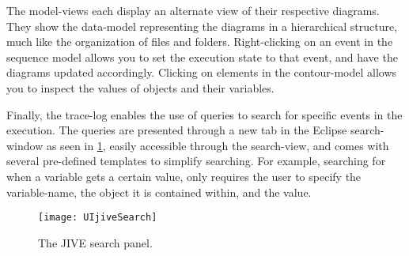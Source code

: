 The model-views each display an alternate view of their respective diagrams.
They show the data-model representing the diagrams in a hierarchical structure, much like the organization of files and folders.
Right-clicking on an event in the sequence model allows you to set the execution state to that event, and have the diagrams updated accordingly.
Clicking on elements in the contour-model allows you to inspect the values of objects and their variables.

Finally, the trace-log enables the use of queries to search for specific events in the execution.
The queries are presented through a new tab in the Eclipse search-window as seen in \cref{fig:UIjiveSearchPanel}, easily accessible through the search-view, and comes with several pre-defined templates to simplify searching.
For example, searching for when a variable gets a certain value, only requires the user to specify the variable-name, the object it is contained within, and the value.
\begin{figure}[H]
	\centering
	\texttt{[image: UIjiveSearch]}
	\caption{The JIVE search panel.}
	\label{fig:UIjiveSearchPanel}
\end{figure}

